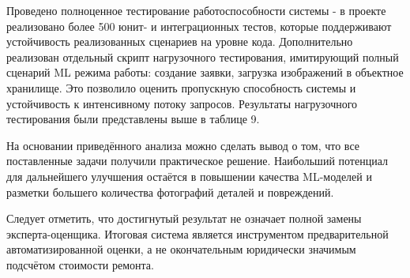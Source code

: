 Проведено полноценное тестирование работоспособности системы - в проекте реализовано более 500 юнит- и интеграционных тестов, которые поддерживают устойчивость реализованных сценариев на уровне кода. 
Дополнительно реализован отдельный скрипт нагрузочного тестирования, имитирующий полный сценарий ML режима работы: создание заявки, загрузка изображений в объектное хранилище. Это позволило оценить пропускную способность системы и устойчивость к интенсивному потоку запросов. Результаты нагрузочного тестирования были представлены выше в таблице 9.

На основании приведённого анализа можно сделать вывод о том, что все поставленные задачи получили практическое решение. Наибольший потенциал для дальнейшего улучшения остаётся в повышении качества ML-моделей и разметки большего количества фотографий деталей и повреждений.

Следует отметить, что достигнутый результат не означает полной замены эксперта-оценщика. Итоговая система является инструментом предварительной автоматизированной оценки, а не окончательным юридически значимым подсчётом стоимости ремонта.

